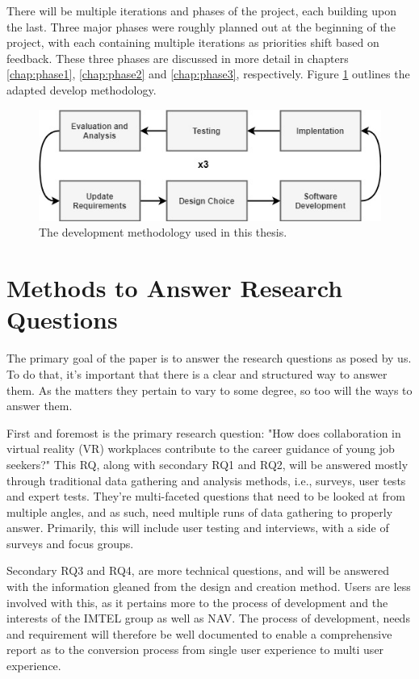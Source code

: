 There will be multiple iterations and phases of the project, each building upon the last. Three major phases were roughly planned out at the beginning of the project, with each containing multiple iterations as priorities shift based on feedback. These three phases are discussed in more detail in chapters \ref{chap:phase1}, \ref{chap:phase2} and \ref{chap:phase3}, respectively. Figure \ref{fig:devMethod} outlines the adapted develop methodology.

\begin{figure}[H]
     \centering
     \includegraphics[width=.8\textwidth]{fig/researchMethodology/devMethod.jpg}
     \captionsetup{width=0.8\linewidth}
     \caption{The development methodology used in this thesis.}
     \label{fig:devMethod}
 \end{figure}



\section{Methods to Answer Research Questions}
The primary goal of the paper is to answer the research questions as posed by us. To do that, it's important that there is a clear and structured way to answer them. As the matters they pertain to vary to some degree, so too will the ways to answer them. 

First and foremost is the primary research question: "How does collaboration in virtual reality (VR) workplaces contribute to the career guidance of young job seekers?"  This RQ, along with secondary RQ1 and RQ2, will be answered mostly through traditional data gathering and analysis methods, i.e., surveys, user tests and expert tests. They're multi-faceted questions that need to be looked at from multiple angles, and as such, need multiple runs of data gathering to properly answer. Primarily, this will include user testing and interviews, with a side of surveys and focus groups.

Secondary RQ3 and RQ4, are more technical questions, and will be answered with the information gleaned from the design and creation method. Users are less involved with this, as it pertains more to the process of development and the interests of the IMTEL group as well as NAV. The process of development, needs and requirement will therefore be well documented to enable a comprehensive report as to the conversion process from single user experience to multi user experience. 



